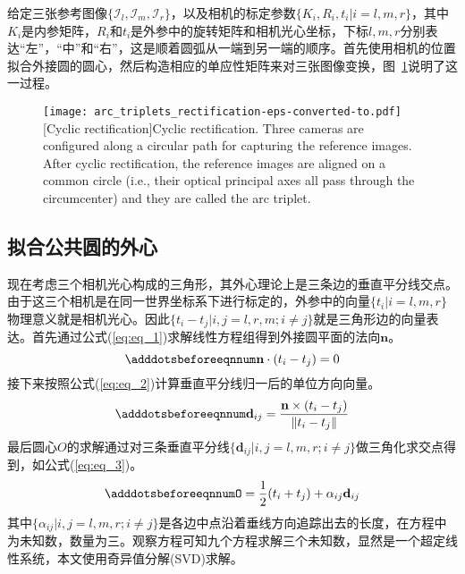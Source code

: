 给定三张参考图像$\{\mathcal{I}_l, \mathcal{I}_m, \mathcal{I}_r\}$，以及相机的标定参数$\{K_i, R_i, t_i | i=l, m, r\}$，其中$K_i$是内参矩阵，$R_i$和$t_i$是外参中的旋转矩阵和相机光心坐标，下标$l, m, r$分别表达“左”，“中”和“右”，这是顺着圆弧从一端到另一端的顺序。首先使用相机的位置拟合外接圆的圆心，然后构造相应的单应性矩阵来对三张图像变换，图~\ref{fig:arc_rect}说明了这一过程。
\begin{figure}[!htbp]
    \centering
    \texttt{[image: arc\_triplets\_rectification-eps-converted-to.pdf]}
    [Cyclic rectification]{Cyclic rectification. Three cameras are configured along a circular path for capturing the reference images. After cyclic rectification, the reference images are aligned on a common circle (i.e., their optical principal axes all pass through the circumcenter) and they are called the arc triplet.}
    \label{fig:arc_rect}
\end{figure}

\subsection{拟合公共圆的外心}
现在考虑三个相机光心构成的三角形，其外心理论上是三条边的垂直平分线交点。由于这三个相机是在同一世界坐标系下进行标定的，外参中的向量$\{t_i | i=l, m, r\}$物理意义就是相机光心。因此$\{t_i - t_j | i, j = l, r, m; i \neq j\}$就是三角形边的向量表达。首先通过公式(\ref{eq:eq_1})求解线性方程组得到外接圆平面的法向$\mathbf{n}$。
\begin{equation} \label{eq:eq_1}
    \adddotsbeforeeqnnum%
    \mathbf{n} \cdot (t_i - t_j) = 0
\end{equation}
接下来按照公式(\ref{eq:eq_2})计算垂直平分线归一后的单位方向向量。
\begin{equation}\label{eq:eq_2}
    \adddotsbeforeeqnnum%
    \mathbf{d}_{ij} = \frac{\mathbf{n} \times (t_i - t_j)}{\|t_i - t_j\|}
\end{equation}
最后圆心$O$的求解通过对三条垂直平分线$\{\mathbf{d}_{ij}|i,j=l, m, r; i \neq j\}$做三角化求交点得到，如公式(\ref{eq:eq_3})。
\begin{equation}\label{eq:eq_3}
    \adddotsbeforeeqnnum%
    O = \frac{1}{2}(t_i + t_j) + \alpha_{ij}\mathbf{d}_{ij}
\end{equation}
其中$\{\alpha_{ij}|i,j=l, m, r; i\neq j\}$是各边中点沿着垂线方向追踪出去的长度，在方程中为未知数，数量为三。观察方程可知九个方程求解三个未知数，显然是一个超定线性系统，本文使用奇异值分解(SVD)求解。


